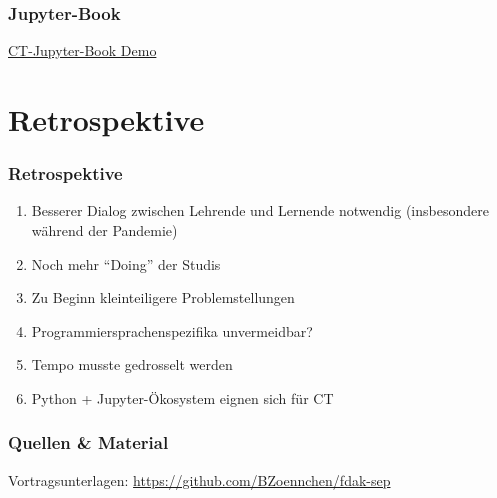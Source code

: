 \documentclass[german,aspectratio=169]{beamer}
\begin{document}
\begin{frame}
	\frametitle{Jupyter-Book}
	\begin{center}
		\href{https://bzoennchen.github.io/ct-book/intro.html}{CT-Jupyter-Book Demo}
	\end{center}
\end{frame}

\section{Retrospektive}

\begin{frame}
	\frametitle{Retrospektive}
	\begin{enumerate}[label = $\bullet$]
		\item Besserer Dialog zwischen Lehrende und Lernende notwendig (insbesondere während der Pandemie)
		\item Noch mehr ``Doing'' der Studis
		\item Zu Beginn kleinteiligere Problemstellungen		 
		\item Programmiersprachenspezifika unvermeidbar?
		\item Tempo musste gedrosselt werden
		\item Python + Jupyter-Ökosystem eignen sich für CT		
	\end{enumerate}
\end{frame}

\appendix

\begin{frame}[plain]
	\frametitle{Quellen \& Material}
	{\scriptsize
	Vortragsunterlagen: \href{https://github.com/BZoennchen/fdak-sep}{https://github.com/BZoennchen/fdak-sep} \\
	\vspace{10pt}
	
	
}
\end{frame}

\end{document}
